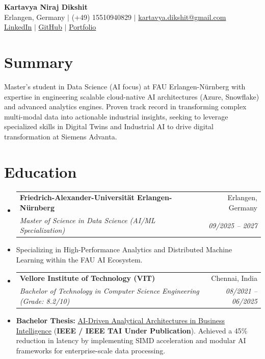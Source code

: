 \documentclass[10pt,a4paper]{article}
\makeatletter
\newcommand{\resumeItem}[1]{\item\small{#1}}
\newcommand{\resumeSubheading}[4]{
  \vspace{-1pt}\item
    \begin{tabular*}{1.0\textwidth}[t]{l@{\extracolsep{\fill}}r}
      \textbf{#1} & #2 \\
      \textit{\small#3} & \textit{\small #4} \\
    \end{tabular*}\vspace{-5pt}
}
\makeatother
\begin{document}
\begin{center}
    \textbf{\huge Kartavya Niraj Dikshit} \\ \vspace{4pt}
    \small Erlangen, Germany $|$ (+49) 15510940829 $|$ \href{mailto:kartavya.dikshit@gmail.com}{kartavya.dikshit@gmail.com} \\
    \small \href{https://www.linkedin.com/in/kartavya-dikshit}{LinkedIn} $|$ \href{https://github.com/KartavyaDikshit}{GitHub} $|$ \href{https://kartavyadikshit.github.io/}{Portfolio}
\end{center}

\section{Summary}
Master’s student in Data Science (AI focus) at FAU Erlangen-Nürnberg with expertise in engineering scalable cloud-native AI architectures (Azure, Snowflake) and advanced analytics engines. Proven track record in transforming complex multi-modal data into actionable industrial insights, seeking to leverage specialized skills in Digital Twins and Industrial AI to drive digital transformation at Siemens Advanta.

\section{Education}
\begin{itemize}[label={}]
    \resumeSubheading
      {Friedrich-Alexander-Universität Erlangen-Nürnberg}{Erlangen, Germany}
      {Master of Science in Data Science (AI/ML Specialization)}{09/2025 -- 2027}
      \resumeItem{Specializing in High-Performance Analytics and Distributed Machine Learning within the FAU AI Ecosystem.}
    \resumeSubheading
      {Vellore Institute of Technology (VIT)}{Chennai, India}
      {Bachelor of Technology in Computer Science Engineering (Grade: 8.2/10)}{08/2021 -- 06/2025}
      \resumeItem{\textbf{Bachelor Thesis:} \href{https://github.com/KartavyaDikshit/Thesis-AI-BI}{AI-Driven Analytical Architectures in Business Intelligence} (\textbf{IEEE / IEEE TAI Under Publication}). Achieved a 45\% reduction in latency by implementing SIMD acceleration and modular AI frameworks for enterprise-scale data processing.}
\end{itemize}
\end{document}
